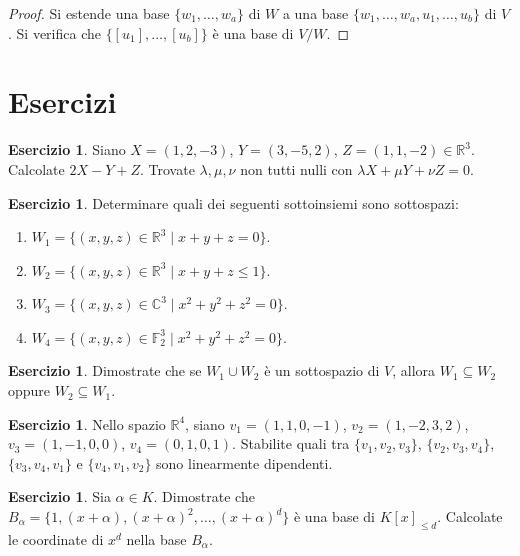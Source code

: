 \documentclass[11pt, a4paper]{book}
\theoremstyle{definition}
\newtheorem{esercizio}[definizione]{Esercizio}
\theoremstyle{plain}
\theoremstyle{remark}
\newcommand{\R}{\mathbb{R}}
\newcommand{\C}{\mathbb{C}}
\begin{document}
\begin{proof}
Si estende una base $\{w_1,\ldots,w_a\}$ di $W$ a una base $\{w_1,\ldots,w_a,u_1,\ldots,u_b\}$ di $V$. Si verifica che $\{[u_1],\ldots,[u_b]\}$ è una base di $V/W$.
\end{proof}

\section*{Esercizi}

\begin{esercizio}
Siano $X = (1,2,-3)$, $Y=(3,-5,2)$, $Z=(1,1,-2) \in \R^3$. Calcolate $2X - Y + Z$. Trovate $\lambda, \mu, \nu$ non tutti nulli con $\lambda X + \mu Y + \nu Z = 0$.
\end{esercizio}

\begin{esercizio}
Determinare quali dei seguenti sottoinsiemi sono sottospazi:
\begin{enumerate}
  \item $W_1 = \{(x,y,z) \in \R^3 \mid x+y+z=0\}$.
  \item $W_2 = \{(x,y,z) \in \R^3 \mid x+y+z \leq 1\}$.
  \item $W_3 = \{(x,y,z) \in \C^3 \mid x^2+y^2+z^2=0\}$.
  \item $W_4 = \{(x,y,z) \in \mathbb{F}_2^3 \mid x^2+y^2+z^2=0\}$.
\end{enumerate}
\end{esercizio}

\begin{esercizio}
Dimostrate che se $W_1 \cup W_2$ è un sottospazio di $V$, allora $W_1 \subseteq W_2$ oppure $W_2 \subseteq W_1$.
\end{esercizio}

\begin{esercizio}
Nello spazio $\R^4$, siano $v_1 = (1,1,0,-1)$, $v_2=(1,-2,3,2)$, $v_3=(1,-1,0,0)$, $v_4=(0,1,0,1)$. Stabilite quali tra $\{v_1,v_2,v_3\}$, $\{v_2,v_3,v_4\}$, $\{v_3,v_4,v_1\}$ e $\{v_4,v_1,v_2\}$ sono linearmente dipendenti.
\end{esercizio}

\begin{esercizio}
Sia $\alpha \in K$. Dimostrate che $B_\alpha = \{1, (x+\alpha), (x+\alpha)^2, \ldots, (x+\alpha)^d\}$ è una base di $K[x]_{\leq d}$. Calcolate le coordinate di $x^d$ nella base $B_\alpha$.
\end{esercizio}
\end{document}
